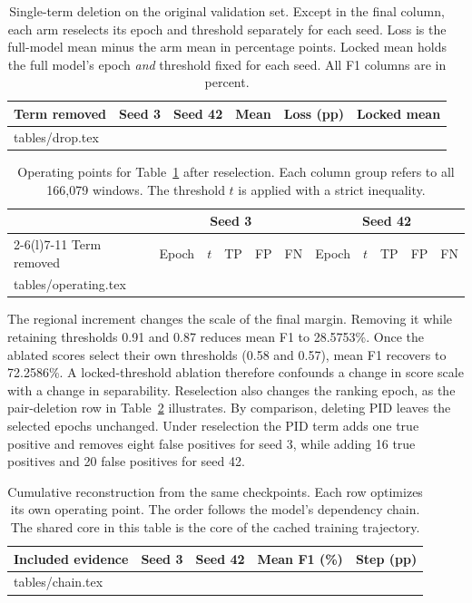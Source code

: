 \begin{table}[ht]
\caption{Single-term deletion on the original validation set. Except in the final column, each arm reselects its epoch and threshold separately for each seed. Loss is the full-model mean minus the arm mean in percentage points. Locked mean holds the full model's epoch \emph{and} threshold fixed for each seed. All F1 columns are in percent.}\label{tab:drop}
\centering\small
\begin{tabular}{@{}lrrrrr@{}}
\toprule Term removed & Seed 3 & Seed 42 & Mean & Loss (pp) & Locked mean \\ \midrule
{} tables/drop.tex
\bottomrule
\end{tabular}
\end{table}

\begin{table}[ht]
\caption{Operating points for Table~\ref{tab:drop} after reselection. Each column group refers to all 166,079 windows. The threshold $t$ is applied with a strict inequality.}\label{tab:ops}
\centering\small
\begin{tabular}{@{}lrrrrrrrrrr@{}}
\toprule & \multicolumn{5}{c}{Seed 3} & \multicolumn{5}{c}{Seed 42} \\
\cmidrule(lr){2-6}\cmidrule(l){7-11}
Term removed & Epoch & $t$ & TP & FP & FN & Epoch & $t$ & TP & FP & FN \\ \midrule
{} tables/operating.tex
\bottomrule
\end{tabular}
\end{table}

The regional increment changes the scale of the final margin. Removing it while retaining thresholds 0.91 and 0.87 reduces mean F1 to 28.5753\%. Once the ablated scores select their own thresholds (0.58 and 0.57), mean F1 recovers to 72.2586\%. A locked-threshold ablation therefore confounds a change in score scale with a change in separability. Reselection also changes the ranking epoch, as the pair-deletion row in Table~\ref{tab:ops} illustrates. By comparison, deleting PID leaves the selected epochs unchanged. Under reselection the PID term adds one true positive and removes eight false positives for seed 3, while adding 16 true positives and 20 false positives for seed 42.

\begin{table}[ht]
\caption{Cumulative reconstruction from the same checkpoints. Each row optimizes its own operating point. The order follows the model's dependency chain. The shared core in this table is the core of the cached training trajectory.}\label{tab:chain}
\centering\small
\begin{tabular}{@{}lrrrr@{}}
\toprule Included evidence & Seed 3 & Seed 42 & Mean F1 (\%) & Step (pp)\\ \midrule
{} tables/chain.tex
\bottomrule
\end{tabular}
\end{table}

